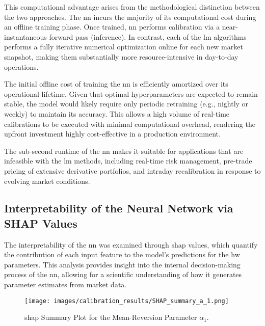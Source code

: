 This computational advantage arises from the methodological distinction between the two approaches. The \ac{nn} incurs the majority of its computational cost during an offline training phase. Once trained, \ac{nn} performs calibration via a near-instantaneous forward pass (inference). In contrast, each of the \ac{lm} algorithms performs a fully iterative numerical optimization online for each new market snapshot, making them substantially more resource-intensive in day-to-day operations.

The initial offline cost of training the \ac{nn} is efficiently amortized over its operational lifetime. Given that optimal hyperparameters are expected to remain stable, the model would likely require only periodic retraining (e.g., nightly or weekly) to maintain its accuracy. This allows a high volume of real-time calibrations to be executed with minimal computational overhead, rendering the upfront investment highly cost-effective in a production environment.

The sub-second runtime of the \ac{nn} makes it suitable for applications that are infeasible with the \ac{lm} methods, including real-time risk management, pre-trade pricing of extensive derivative portfolios, and intraday recalibration in response to evolving market conditions.

\subsection{Interpretability of the Neural Network via SHAP Values}
The interpretability of the \ac{nn} was examined through \ac{shap} values, which quantify the contribution of each input feature to the model's predictions for the \ac{hw} parameters. This analysis provides insight into the internal decision-making process of the \ac{nn}, allowing for a scientific understanding of how it generates parameter estimates from market data.

\begin{figure}[H]
	\centering
	\texttt{[image: images/calibration\_results/SHAP\_summary\_a\_1.png]}
	\caption{\ac{shap} Summary Plot for the Mean-Reversion Parameter $\alpha_1$.}
	\label{fig:shap_summary_alpha_1}
\end{figure}

